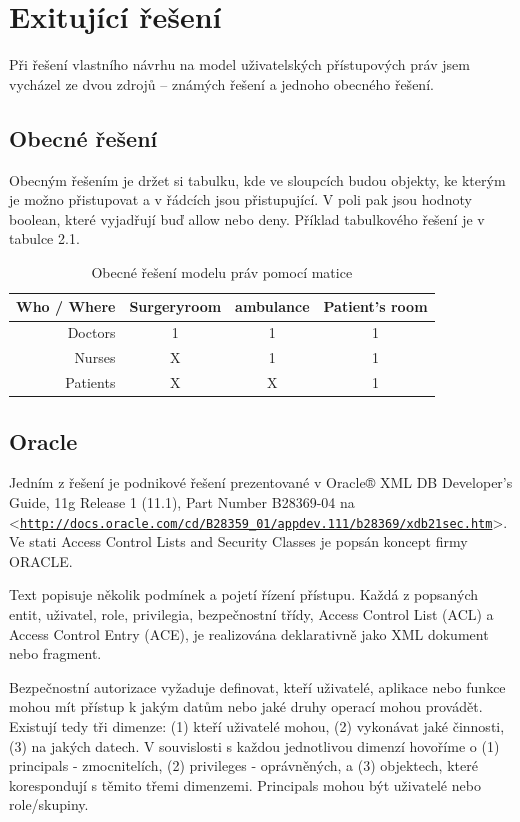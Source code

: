 \documentclass[11pt,twoside,a4paper]{book}
\let\oldUrl\url
\renewcommand\url[1]{<\texttt{\oldUrl{#1}}>}
\begin{document}
\section{Exitující řešení}

Při řešení vlastního návrhu na model uživatelských přístupových práv jsem vycházel ze dvou zdrojů – známých řešení a jednoho obecného řešení.

\subsection{Obecné řešení}
Obecným řešením je držet si tabulku, kde ve sloupcích budou objekty, ke kterým je možno přistupovat a v řádcích jsou přistupující. V poli pak jsou hodnoty boolean, které vyjadřují buď allow nebo deny. Příklad tabulkového řešení je v tabulce 2.1.

\begin{table}%
\centering
\begin{tabular}{|r||c|c|c|}
\hline
Who / Where & Surgeryroom & ambulance & Patient's room\\
\hline\hline
Doctors & 1 & 1 & 1\\
\hline
Nurses & X & 1 & 1\\
\hline
Patients & X & X & 1\\
\hline
\end{tabular}
\caption{Obecné řešení modelu práv pomocí matice}
\end{table}


\subsection{Oracle}
Jedním z řešení je podnikové řešení prezentované v Oracle® XML DB Developer's Guide, 11g Release 1 (11.1), Part Number B28369-04 na \url{http://docs.oracle.com/cd/B28359_01/appdev.111/b28369/xdb21sec.htm}. Ve stati Access Control Lists and Security Classes je popsán koncept firmy ORACLE.
 
Text popisuje několik podmínek a pojetí řízení přístupu. Každá z popsaných entit, uživatel, role, privilegia, bezpečnostní třídy, Access Control List (ACL) a Access Control Entry (ACE), je realizována deklarativně jako XML dokument nebo fragment.  

Bezpečnostní autorizace vyžaduje definovat, kteří uživatelé, aplikace nebo funkce mohou mít přístup k jakým datům nebo jaké druhy operací mohou provádět. Existují tedy tři dimenze: (1) kteří uživatelé mohou, (2) vykonávat jaké činnosti, (3) na jakých datech. V souvislosti s každou jednotlivou dimenzí hovoříme o (1) principals - zmocnitelích, (2) privileges - oprávněných, a (3) objektech, které korespondují s těmito třemi dimenzemi. Principals mohou být uživatelé nebo role/skupiny.
\end{document}
